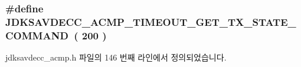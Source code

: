\subsubsection[{\texorpdfstring{J\+D\+K\+S\+A\+V\+D\+E\+C\+C\+\_\+\+A\+C\+M\+P\+\_\+\+T\+I\+M\+E\+O\+U\+T\+\_\+\+G\+E\+T\+\_\+\+T\+X\+\_\+\+S\+T\+A\+T\+E\+\_\+\+C\+O\+M\+M\+A\+ND}{JDKSAVDECC_ACMP_TIMEOUT_GET_TX_STATE_COMMAND}}]{\setlength{\rightskip}{0pt plus 5cm}\#define J\+D\+K\+S\+A\+V\+D\+E\+C\+C\+\_\+\+A\+C\+M\+P\+\_\+\+T\+I\+M\+E\+O\+U\+T\+\_\+\+G\+E\+T\+\_\+\+T\+X\+\_\+\+S\+T\+A\+T\+E\+\_\+\+C\+O\+M\+M\+A\+ND~( 200 )}\hypertarget{group__acmp__timeouts_ga0475a741d0f627cf0ae1515a7eec50b2}{}\label{group__acmp__timeouts_ga0475a741d0f627cf0ae1515a7eec50b2}


jdksavdecc\+\_\+acmp.\+h 파일의 146 번째 라인에서 정의되었습니다.

